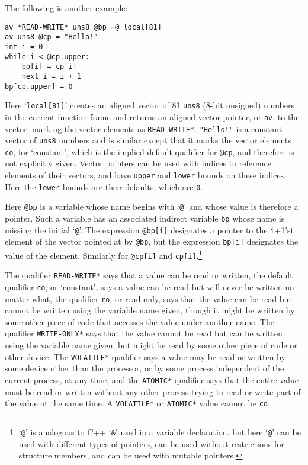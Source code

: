 \documentclass[12pt]{article}
\newenvironment{indpar}[1][0.3in]%
	{\begin{list}{}%
		     {\setlength{\itemsep}{0in}%
		      \setlength{\topsep}{0in}%
		      \setlength{\parsep}{1ex}%
		      \setlength{\labelwidth}{#1}%
		      \setlength{\leftmargin}{#1}%
		      \addtolength{\leftmargin}{\labelsep}}%
	 \item}%
	{\end{list}}
\begin{document}
The following is another example:
\begin{indpar}\begin{verbatim}
av *READ-WRITE* uns8 @bp =@ local[81]
av uns8 @cp = "Hello!"
int i = 0
while i < @cp.upper:
    bp[i] = cp[i]
    next i = i + 1
bp[cp.upper] = 0
\end{verbatim}\end{indpar}

Here `{\tt local[81]}' creates an aligned vector of
81 {\tt uns8} (8-bit unsigned) numbers in the current function
frame and returns an aligned vector pointer, or {\tt av}, to
the vector, marking the vector elements as {\tt *READ-WRITE*}.
{\tt "Hello!"} is a constant vector of {\tt uns8} numbers
and is similar except that it marks the vector elements
{\tt co}, for `constant', which is the implied default qualifier
for {\tt @cp}, and therefore
is not explicitly given.
Vector pointers can be used with indices
to reference elements of their vectors, and have {\tt upper} and
{\tt lower} bounds on these indices.  Here the {\tt lower} bounds
are their defaults, which are {\tt 0}.

Here {\tt @bp} is a variable whose name begins with `{\tt @}' and
whose value is therefore a pointer.  Such a variable has an associated
indirect variable {\tt bp} whose name is missing the initial `{\tt @}'.
The expression {\tt @bp[i]} designates a pointer to the {\tt i}+1'st
element of the vector pointed at by {\tt @bp}, but the expression
{\tt bp[i]} designates the value of the element.  Similarly for
{\tt @cp[i]} and {\tt cp[i]}.\footnote{`{\tt @}' is analogous to
C++ `{\tt \&}' used in a variable declaration, but here `{\tt @}'
can be used with different types of pointers, can be used
without restrictions for structure members, and can be used
with mutable pointers.}

The qualifier {\tt *READ-WRITE*} says that a value can be read or written,
the default qualifier {\tt co}, or `constant',
says a value can be read but will \underline{never} be written no matter what,
the qualifier {\tt ro}, or read-only, says that
the value can be read but
cannot be written using the variable name given, though it might be
written by some other piece of code that accesses the value under another
name.  The qualifier {\tt *WRITE-ONLY*} says that the value cannot be
read but can be written using the variable name given,
but might be read by some other piece of code or other device.
The {\tt *VOLATILE*} qualifier says a value may be
read or written by some device other than the processor, or by some process
independent of the current process, at any time, and the
{\tt *ATOMIC*} qualifier says that the entire value must be read
or written without any other process trying to read or write part of the
value at the same time.
A {\tt *VOLATILE*} or {\tt *ATOMIC*} value cannot be {\tt co}.
\end{document}
